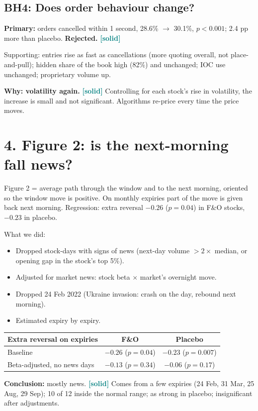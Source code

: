 \documentclass[11pt]{article}
\newcommand{\solid}{\textcolor{teal}{\textbf{[solid]}}}
\begin{document}
\subsection*{BH4: Does order behaviour change?}
\textbf{Primary:} orders cancelled within 1 second, 28.6\% $\to$ 30.1\%, $p<0.001$; 2.4 pp more
than placebo. \textbf{Rejected.} \solid

Supporting: entries rise as fast as cancellations (more quoting overall, not place-and-pull);
hidden share of the book high (82\%) and unchanged; IOC use unchanged; proprietary volume up.

\textbf{Why: volatility again.} \solid{} Controlling for each stock's rise in volatility, the
increase is small and not significant. Algorithms re-price every time the price moves.

\section*{4. Figure 2: is the next-morning fall news?}
Figure 2 = average path through the window and to the next morning, oriented so the window
move is positive. On monthly expiries part of the move is given back next morning.
Regression: extra reversal $-0.26$ ($p=0.04$) in F\&O stocks, $-0.23$ in placebo.

What we did:
\begin{itemize}
  \item Dropped stock-days with signs of news (next-day volume $> 2\times$ median, or opening gap
  in the stock's top 5\%).
  \item Adjusted for market news: stock beta $\times$ market's overnight move.
  \item Dropped 24 Feb 2022 (Ukraine invasion: crash on the day, rebound next morning).
  \item Estimated expiry by expiry.
\end{itemize}
\begin{center}
\small
\begin{tabular}{lcc}
\toprule
Extra reversal on expiries & F\&O & Placebo \\
\midrule
Baseline & $-0.26$ ($p=0.04$) & $-0.23$ ($p=0.007$) \\
Beta-adjusted, no news days & $-0.13$ ($p=0.34$) & $-0.06$ ($p=0.17$) \\
\bottomrule
\end{tabular}
\end{center}
\textbf{Conclusion:} mostly news. \solid{} Comes from a few expiries (24 Feb, 31 Mar, 25 Aug,
29 Sep); 10 of 12 inside the normal range; as strong in placebo; insignificant after
adjustments.
\end{document}
